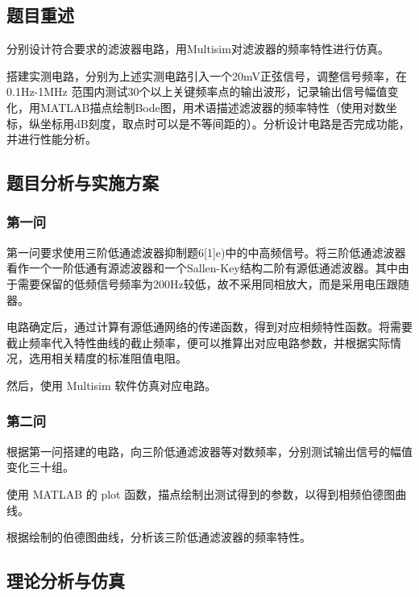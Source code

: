 \documentclass[./测控三级项目.tex]{subfiles} %
\begin{document}
	\subsection{题目重述}
		\begin{compactenum}
			\item 分别设计符合要求的滤波器电路，用Multisim对滤波器的频率特性进行仿真。
			\item 搭建实测电路，分别为上述实测电路引入一个20mV正弦信号，调整信号频率，在0.1Hz-1MHz 范围内测试30个以上关键频率点的输出波形，记录输出信号幅值变化，用MATLAB描点绘制Bode图，用术语描述滤波器的频率特性（使用对数坐标，纵坐标用dB刻度，取点时可以是不等间距的）。分析设计电路是否完成功能，并进行性能分析。
		\end{compactenum}
	\subsection{题目分析与实施方案}
		\subsubsection{第一问}
			第一问要求使用三阶低通滤波器抑制题6[1]e)中的中高频信号。将三阶低通滤波器看作一个一阶低通有源滤波器和一个Sallen-Key结构二阶有源低通滤波器。其中由于需要保留的低频信号频率为200Hz较低，故不采用同相放大，而是采用电压跟随器。\par
			电路确定后，通过计算有源低通网络的传递函数，得到对应相频特性函数。将需要截止频率代入特性曲线的截止频率，便可以推算出对应电路参数，并根据实际情况，选用相关精度的标准阻值电阻。 \par
			然后，使用 Multisim 软件仿真对应电路。
		\subsubsection{第二问}
			根据第一问搭建的电路，向三阶低通滤波器等对数频率，分别测试输出信号的幅值变化三十组。\par 
			使用 MATLAB 的 plot 函数，描点绘制出测试得到的参数，以得到相频伯德图曲线。 \par
			根据绘制的伯德图曲线，分析该三阶低通滤波器的频率特性。
	\subsection{理论分析与仿真}
\end{document}
